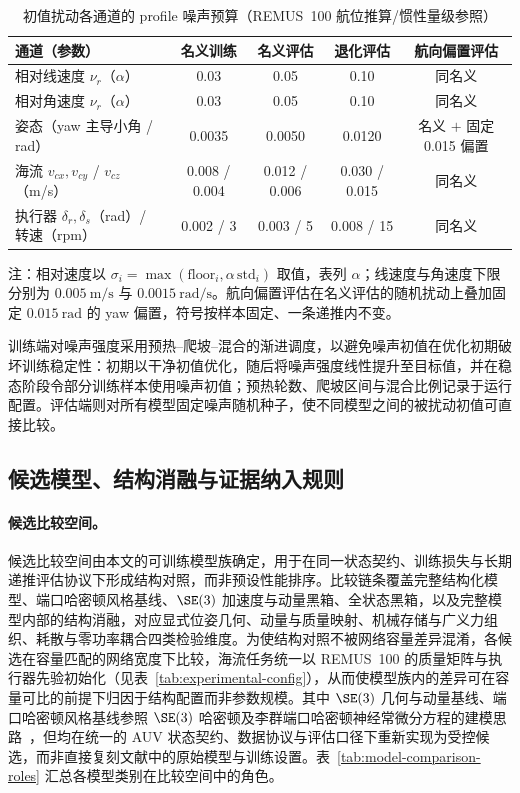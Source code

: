 \begin{table}[htbp]
  \centering
  \caption{初值扰动各通道的 profile 噪声预算（REMUS~100 航位推算/惯性量级参照）}
  \label{tab:noise-budget}
  \small
  \begin{tabularx}{\textwidth}{>{\raggedright\arraybackslash}X cccc}
    \toprule
    通道（参数） & 名义训练 & 名义评估 & 退化评估 & 航向偏置评估 \\
    \midrule
    相对线速度 \(\nu_r\)（\(\alpha\)）& 0.03 & 0.05 & 0.10 & 同名义 \\
    相对角速度 \(\nu_r\)（\(\alpha\)）& 0.03 & 0.05 & 0.10 & 同名义 \\
    姿态（yaw 主导小角 / rad）& 0.0035 & 0.0050 & 0.0120 & 名义 \(+\) 固定 0.015 偏置 \\
    海流 \(v_{cx},v_{cy}\) / \(v_{cz}\)（m/s）& 0.008 / 0.004 & 0.012 / 0.006 & 0.030 / 0.015 & 同名义 \\
    执行器 \(\delta_r,\delta_s\)（rad）/ 转速（rpm）& 0.002 / 3 & 0.003 / 5 & 0.008 / 15 & 同名义 \\
    \bottomrule
  \end{tabularx}
  \par\vspace{2pt}
  \footnotesize 注：相对速度以 \(\sigma_i=\max(\text{floor}_i,\alpha\,\mathrm{std}_i)\) 取值，表列 \(\alpha\)；线速度与角速度下限分别为 \(0.005~\mathrm{m/s}\) 与 \(0.0015~\mathrm{rad/s}\)。航向偏置评估在名义评估的随机扰动上叠加固定 \(0.015~\mathrm{rad}\) 的 yaw 偏置，符号按样本固定、一条递推内不变。
\end{table}

训练端对噪声强度采用预热--爬坡--混合的渐进调度，以避免噪声初值在优化初期破坏训练稳定性：初期以干净初值优化，随后将噪声强度线性提升至目标值，并在稳态阶段令部分训练样本使用噪声初值；预热轮数、爬坡区间与混合比例记录于运行配置。评估端则对所有模型固定噪声随机种子，使不同模型之间的被扰动初值可直接比较。

\subsection{候选模型、结构消融与证据纳入规则}
\label{subsec:candidates-evidence}

\paragraph{候选比较空间。}候选比较空间由本文的可训练模型族确定，用于在同一状态契约、训练损失与长期递推评估协议下形成结构对照，而非预设性能排序。比较链条覆盖完整结构化模型、端口哈密顿风格基线、\(\SE(3)\) 加速度与动量黑箱、全状态黑箱，以及完整模型内部的结构消融，对应显式位姿几何、动量与质量映射、机械存储与广义力组织、耗散与零功率耦合四类检验维度。为使结构对照不被网络容量差异混淆，各候选在容量匹配的网络宽度下比较，海流任务统一以 REMUS~100 的质量矩阵与执行器先验初始化（见表~\ref{tab:experimental-config}），从而使模型族内的差异可在容量可比的前提下归因于结构配置而非参数规模。其中 \(\SE(3)\) 几何与动量基线、端口哈密顿风格基线参照 \(\SE(3)\) 哈密顿及李群端口哈密顿神经常微分方程的建模思路~\citep{duong2021se3hamnode,duong2024liegroupphnode}，但均在统一的 AUV 状态契约、数据协议与评估口径下重新实现为受控候选，而非直接复刻文献中的原始模型与训练设置。表~\ref{tab:model-comparison-roles} 汇总各模型类别在比较空间中的角色。

